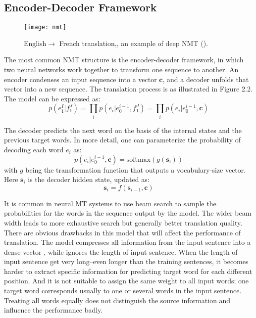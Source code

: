 \subsection{Encoder-Decoder Framework}
\begin{figure}[t]
	\texttt{[image: nmt]}
	\caption{ English$\rightarrow$ French translation,, an example of deep NMT (\cite{luong2015effective}).}
	\centering
\end{figure}

The most common NMT structure is the encoder-decoder framework, in which two  neural networks work together to transform one sequence to another. An encoder condenses an input sequence into a vector $\bm{c}$, and a decoder unfolds that vector into a new sequence. The translation process is as illustrated in Figure 2.2. The model can be expressed as:
\[ p(e_1^I | f_1^J) = \prod_{i} p(e_i|e_0^{i-1}, f_1^J) = \prod_{i} {p(e_i|e_0^{i-1},  {\bm{c}})} \] 

 The decoder predicts the next word on the basis of the internal states and the previous target words. In more detail, one can parameterize the probability of decoding each word $e_i$ as:
 \[ p(e_i|e_0^{i-1},  {\bm{c}}) = \text{softmax}(g(\bm{s_i}))\]
 with $g$ being the transformation function that outputs a vocabulary-size vector. Here $\bm{s}_i$ is the decoder hidden state, updated as:
\[ \bm{s}_i = f(\bm{s}_{i-1}, \bm{c})\]

It is common in neural MT systems to use beam search to sample the probabilities for the words in the sequence output by the model. The wider beam width leads to more exhaustive search but generally better translation quality.\\

%
%

There are obvious drawbacks in this model that will affect the performance of translation. The model compresses all information from the input sentence into a dense vector , while ignores the length of input sentence. When the length of input sentence get very long--even longer than the training sentences, it becomes harder to extract specific information for predicting  target word for each different position. And it is not suitable to assign the same weight to all input words; one target word corresponds usually to one or several words in the input sentence. Treating all words equally does not distinguish the source information and influence the performance badly.


